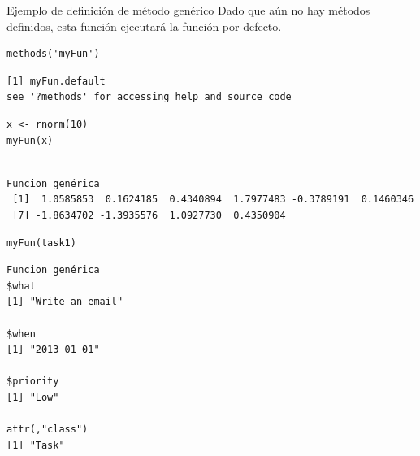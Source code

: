 \documentclass[xcolor={usenames,svgnames,dvipsnames}]{beamer}
\begin{document}
\begin{frame}[label={sec:org0980f03},fragile]{Ejemplo de definición de método genérico}
 Dado que aún no hay métodos definidos, esta función ejecutará la función por defecto.
\lstset{language=r,label= ,caption= ,captionpos=b,numbers=none}
\begin{lstlisting}
methods('myFun')
\end{lstlisting}

\begin{verbatim}
[1] myFun.default
see '?methods' for accessing help and source code
\end{verbatim}


\lstset{language=r,label= ,caption= ,captionpos=b,numbers=none}
\begin{lstlisting}
x <- rnorm(10)
myFun(x)
\end{lstlisting}

\begin{verbatim}

Funcion genérica
 [1]  1.0585853  0.1624185  0.4340894  1.7977483 -0.3789191  0.1460346
 [7] -1.8634702 -1.3935576  1.0927730  0.4350904
\end{verbatim}


\lstset{language=r,label= ,caption= ,captionpos=b,numbers=none}
\begin{lstlisting}
myFun(task1)
\end{lstlisting}

\begin{verbatim}
Funcion genérica
$what
[1] "Write an email"

$when
[1] "2013-01-01"

$priority
[1] "Low"

attr(,"class")
[1] "Task"
\end{verbatim}
\end{frame}
\end{document}
